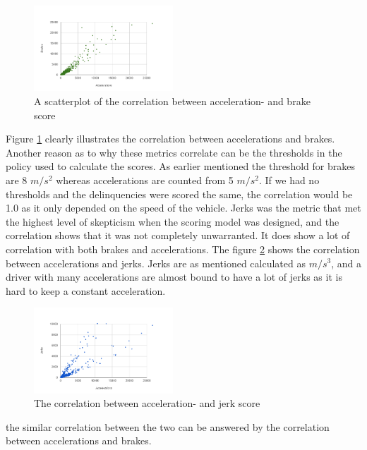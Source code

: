 \begin{figure}[tb]
\centering
\includegraphics[width=0.465\textwidth]{Pictures/abcorrel}
\caption{A scatterplot of the correlation between acceleration- and brake score}
\label{fig:abcorrel}
\end{figure}

Figure \ref{fig:abcorrel} clearly illustrates the correlation between accelerations and brakes. Another reason as to why these metrics correlate can be the thresholds in the policy used to calculate the scores. As earlier mentioned the threshold for brakes are 8 $m/s^2$ whereas accelerations are counted from 5 $m/s^2$. If we had no thresholds and the delinquencies were scored the same, the correlation would be 1.0 as it only depended on the speed of the vehicle. 
Jerks was the metric that met the highest level of skepticism when the scoring model was designed, and the correlation shows that it was not completely unwarranted. It does show a lot of correlation with both brakes and accelerations. The figure \ref{fig:ajcorrel} shows the correlation between accelerations and jerks. Jerks are as mentioned calculated as $m/s^3$, and a driver with many accelerations are almost bound to have a lot of jerks as it is hard to keep a constant acceleration.

\begin{figure}[tb]
\centering
\includegraphics[width=0.465\textwidth]{Pictures/ajcorrel}
\caption{The correlation between acceleration- and jerk score}
\label{fig:ajcorrel}
\end{figure}


the similar correlation between the two can be answered by the correlation between accelerations and brakes. 